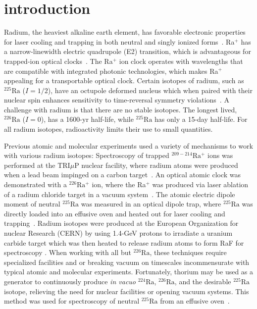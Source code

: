 \documentclass[
 reprint,
 amsmath,amssymb,
 aps,
 prr,
 superscriptaddress,
]{revtex4-2}
\newcommand{\iso}[2]{\ensuremath{^{#2}\mathrm{#1}}}
\begin{document}
\section{introduction}

Radium, the heaviest alkaline earth element, has favorable electronic properties for laser cooling and trapping in both neutral and singly ionized forms~\cite{Guest2007,Fan2019}. Ra$^+$ has a narrow-linewidth electric quadrupole (E2) transition, which is advantageous for trapped-ion optical clocks~\cite{Sahoo2007, Versolato2011b, Holliman2022}. The Ra$^+$ ion clock operates with wavelengths that are compatible with integrated photonic technologies, which makes Ra$^+$ appealing for a transportable optical clock. Certain isotopes of radium, such as \iso{Ra}{225} ($I=1/2$), have an octupole deformed nucleus which when paired with their nuclear spin enhances sensitivity to time-reversal symmetry violations~\cite{Parker2015}.  A challenge with radium is that there are no stable isotopes.  The longest lived, \iso{Ra}{226} ($I=0$), has a 1600-yr half-life, while \iso{Ra}{225} has only a 15-day half-life.  For all radium isotopes, radioactivity limits their use to small quantities.

Previous atomic and molecular experiments used a variety of mechanisms to work with various radium isotopes:   Spectroscopy of trapped \iso{Ra}{209-214}$^+$ ions was performed at the TRI$\mu$P nuclear facility, where radium atoms were produced when a lead beam impinged on a carbon target~\cite{Giri2011a}. An optical atomic clock was demonstrated with a \iso{Ra}{226}$^+$ ion, where the Ra$^+$ was produced via laser ablation of a radium chloride target in a vacuum system~\cite{Holliman2022}. The atomic electric dipole moment of neutral \iso{Ra}{225} was measured in an optical dipole trap, where \iso{Ra}{225} was directly loaded into an effusive oven and heated out for laser cooling and trapping~\cite{Parker2015}.  Radium isotopes were produced at the European Organization for nuclear Research (CERN) by using 1.4-GeV protons to irradiate a uranium carbide target which was then heated to release radium atoms to form RaF for spectroscopy \cite{GarciaRuiz2020}.  When working with all but \iso{Ra}{226}, these techniques require specialized facilities and or breaking vacuum on timescales incommensurate with typical atomic and molecular experiments. Fortunately, thorium may be used as a generator to continuously produce \emph{in vacuo} \iso{Ra}{224}, \iso{Ra}{226}, and the desirable \iso{Ra}{225} isotope, relieving the need for nuclear facilities or opening vacuum systems.  This method was used for spectroscopy of neutral \iso{Ra}{225} from an effusive oven~\cite{Santra2013,Santra2014}.
\end{document}
